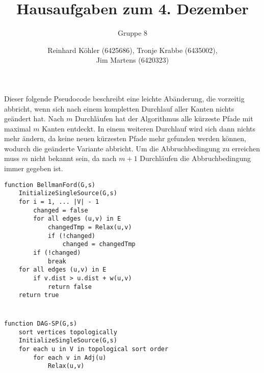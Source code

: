 \documentclass[10pt,a4paper,oneside,ngerman,numbers=noenddot]{scrartcl}
\begin{document}
\author{Reinhard Köhler (6425686), Tronje Krabbe (6435002), \\
Jim Martens (6420323)}
\title{Hausaufgaben zum 4. Dezember}
\subtitle{Gruppe 8}
\maketitle

\section{} %
	Dieser folgende Pseudocode beschreibt eine leichte Abänderung, die vorzeitig abbricht, wenn sich nach einem kompletten Durchlauf aller Kanten nichts geändert hat. Nach $m$ Durchläufen hat der Algorithmus alle kürzeste Pfade mit maximal $m$ Kanten entdeckt. In einem weiteren Durchlauf wird sich dann nichts mehr ändern, da keine neuen kürzesten Pfade mehr gefunden werden können, wodurch die geänderte Variante abbricht. Um die Abbruchbedingung zu erreichen muss $m$ nicht bekannt sein, da nach $m+1$ Durchläufen die Abbruchbedingung immer gegeben ist.
	\begin{verbatim}
function BellmanFord(G,s)
    InitializeSingleSource(G,s)
    for i = 1, ... |V| - 1
        changed = false	            
        for all edges (u,v) in E
            changedTmp = Relax(u,v)
            if (!changed)
                changed = changedTmp
        if (!changed)
            break
    for all edges (u,v) in E
        if v.dist > u.dist + w(u,v)
            return false
    return true
	\end{verbatim}
\section{} %
	\begin{verbatim}
function DAG-SP(G,s)
    sort vertices topologically
    InitializeSingleSource(G,s)
    for each u in V in topological sort order
        for each v in Adj(u)
            Relax(u,v)
	\end{verbatim}
\end{document}
